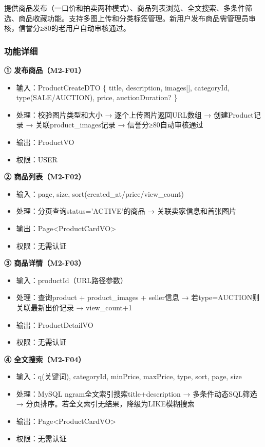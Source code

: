 \documentclass[12pt,a4paper]{ctexart}
\numberwithin{figure}{section}
\numberwithin{table}{section}
\begin{document}
提供商品发布（一口价和拍卖两种模式）、商品列表浏览、全文搜索、多条件筛选、商品收藏功能。支持多图上传和分类标签管理。新用户发布商品需管理员审核，信誉分≥80的老用户自动审核通过。

\subsubsection{功能详细}

\textbf{① 发布商品（M2-F01）}

\begin{itemize}
    \item 输入：ProductCreateDTO \{ title, description, images[], categoryId, type(SALE/AUCTION), price, auctionDuration? \}
    \item 处理：校验图片类型和大小 → 逐个上传图片返回URL数组 → 创建Product记录 → 关联product\_images记录 → 信誉分≥80自动审核通过
    \item 输出：ProductVO
    \item 权限：USER
\end{itemize}

\textbf{② 商品列表（M2-F02）}

\begin{itemize}
    \item 输入：page, size, sort(created\_at/price/view\_count)
    \item 处理：分页查询status='ACTIVE'的商品 → 关联卖家信息和首张图片
    \item 输出：Page<ProductCardVO>
    \item 权限：无需认证
\end{itemize}

\textbf{③ 商品详情（M2-F03）}

\begin{itemize}
    \item 输入：productId（URL路径参数）
    \item 处理：查询product + product\_images + seller信息 → 若type=AUCTION则关联最新出价记录 → view\_count+1
    \item 输出：ProductDetailVO
    \item 权限：无需认证
\end{itemize}

\textbf{④ 全文搜索（M2-F04）}

\begin{itemize}
    \item 输入：q(关键词), categoryId, minPrice, maxPrice, type, sort, page, size
    \item 处理：MySQL ngram全文索引搜索title+description → 多条件动态SQL筛选 → 分页排序。若全文索引无结果，降级为LIKE模糊搜索
    \item 输出：Page<ProductCardVO>
    \item 权限：无需认证
\end{itemize}
\end{document}
